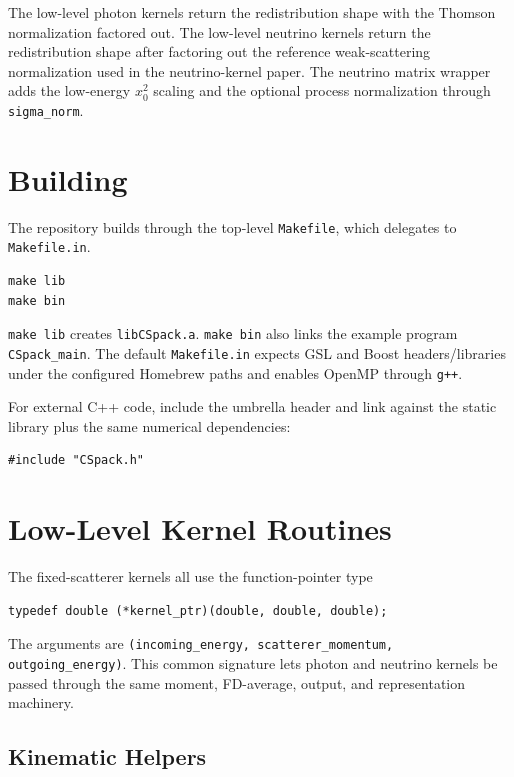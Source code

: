 \documentclass[11pt]{article}
\begin{document}
The low-level photon kernels return the redistribution shape with the Thomson
normalization factored out. The low-level neutrino kernels return the
redistribution shape after factoring out the reference weak-scattering
normalization used in the neutrino-kernel paper. The neutrino matrix wrapper
adds the low-energy $x_0^2$ scaling and the optional process normalization
through \texttt{sigma\_norm}.

\section{Building}

The repository builds through the top-level \texttt{Makefile}, which delegates
to \texttt{Makefile.in}.
\begin{verbatim}
make lib
make bin
\end{verbatim}
\texttt{make lib} creates \texttt{libCSpack.a}. \texttt{make bin} also links
the example program \texttt{CSpack\_main}. The default \texttt{Makefile.in}
expects GSL and Boost headers/libraries under the configured Homebrew paths and
enables OpenMP through \texttt{g++}.

For external C++ code, include the umbrella header and link against the static
library plus the same numerical dependencies:
\begin{verbatim}
#include "CSpack.h"
\end{verbatim}

\section{Low-Level Kernel Routines}

The fixed-scatterer kernels all use the function-pointer type
\begin{verbatim}
typedef double (*kernel_ptr)(double, double, double);
\end{verbatim}
The arguments are \texttt{(incoming\_energy, scatterer\_momentum,
outgoing\_energy)}. This common signature lets photon and neutrino kernels be
passed through the same moment, FD-average, output, and representation
machinery.

\subsection{Kinematic Helpers}
\end{document}

